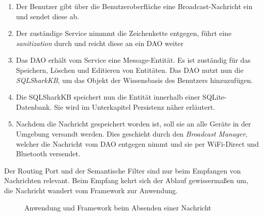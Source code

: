 \begin{enumerate}
	\item Der Benutzer gibt über die Benutzeroberfläche eine Broadcast-Nachricht ein und sendet diese ab. 
	\item Der zuständige Service nimmmt die Zeichenkette entgegen, führt eine \textit{sanitization} durch und reicht diese an ein DAO weiter
	\item Das DAO erhält vom Service eine Message-Entität. Es ist zuständig für das Speichern, Löschen und Editieren von Entitäten. Das DAO nutzt nun die \textit{SQLSharkKB}, um das Objekt der Wissensbasis des Benutzers hinzuzufügen. 
	\item Die SQLSharkKB speichert nun die Entität innerhalb einer SQLite-Datenbank. Sie wird im Unterkapitel Persistenz näher erläutert.
	\item Nachdem die Nachricht gespeichert worden ist, soll sie an alle Geräte in der Umgebung versandt werden. Dies geschieht durch den \textit{Broadcast Manager}, welcher die Nachricht vom DAO entgegen nimmt und sie per WiFi-Direct und Bluetooth versendet.
\end{enumerate}
Der Routing Port und der Semantische Filter sind nur beim Empfangen von Nachrichten relevant. Beim Empfang kehrt sich der Ablauf gewissermaßen um, die Nachricht wandert vom Framework zur Anwendung. 
\begin{figure}[H]
	\centering
	\hspace*{1cm}
	\caption{Anwendung und Framework beim Absenden einer Nachricht}
	\label{fig:empfangenNachrichtStruktur}
\end{figure}
